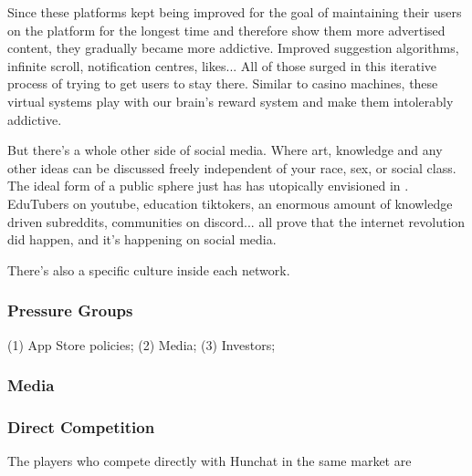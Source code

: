 \documentclass[12pt]{article}
\begin{document}
	 Since these platforms kept being improved for the goal of maintaining their users on the platform for the longest time and therefore show them more advertised content, they gradually became more addictive. Improved suggestion algorithms, infinite scroll, notification centres, likes... All of those surged in this iterative process of trying to get users to stay there. Similar to casino machines, these virtual systems play with our brain's reward system and make them intolerably addictive. 
	 
	 But there's a whole other side of social media. Where art, knowledge and any other ideas can be discussed freely independent of your race, sex, or social class. The ideal form of a public sphere just has \citeauthor{habermas} has utopically envisioned in \citeyear{habermas}. EduTubers on youtube, education tiktokers, an enormous amount of knowledge driven subreddits, communities on discord... all prove that the internet revolution did happen, and it's happening on social media.
	 
	 
	 	 
	 There's also a specific culture inside each network.
	 
	 


	\subsubsection{Pressure Groups}
	(1) App Store policies; (2) Media; (3) Investors; 
	
	\subsubsection{Media}
	
	\subsubsection{Direct Competition}
	The players who compete directly with Hunchat in the same market are
	
\end{document}
